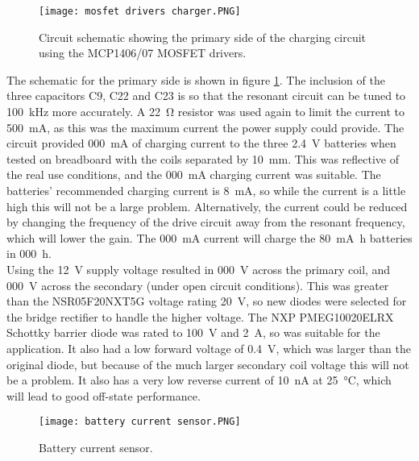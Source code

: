 \begin{figure}[htbp]
	\centering
	\texttt{[image: mosfet drivers charger.PNG]}
	\caption{Circuit schematic showing the primary side of the charging circuit using the MCP1406/07 MOSFET drivers.}
	\label{fig: mosfet drivers charger}
\end{figure}

 
The schematic for the primary side is shown in figure \ref{fig: mosfet drivers charger}. The inclusion of the three capacitors C9, C22 and C23 is so that the resonant circuit can be tuned to \SI{100}{\kilo\hertz} more accurately. A \SI{22}{\ohm} resistor was used again to limit the current to \SI{500}{\milli\ampere}, as this was the maximum current the power supply could provide. The circuit provided \SI{000}{\milli\ampere} of charging current to the three \SI{2.4}{\volt} batteries when tested on breadboard with the coils separated by \SI{10}{\milli\metre}. This was reflective of the real use conditions, and the \SI{000}{\milli\ampere} charging current was suitable. The batteries' recommended charging current is \SI{8}{\milli\ampere}, so while the current is a little high this will not be a large problem. Alternatively, the current could be reduced by changing the frequency of the drive circuit away from the resonant frequency, which will lower the gain. The \SI{000}{\milli\ampere} current will charge the \SI{80}{\milli\ampere\hour} batteries in \SI{000}{\hour}.\\

Using the \SI{12}{\volt} supply voltage resulted in \SI{000}{\volt} across the primary coil, and \SI{000}{\volt} across the secondary (under open circuit conditions). This was greater than the NSR05F20NXT5G voltage rating \SI{20}{\volt}, so new diodes were selected for the bridge rectifier to handle the higher voltage. The NXP PMEG10020ELRX Schottky barrier diode \cite{new_diode} was rated to \SI{100}{\volt} and \SI{2}{\ampere}, so was suitable for the application. It also had a low forward voltage of \SI{0.4}{\volt}, which was larger than the original diode, but because of the much larger secondary coil voltage this will not be a problem. It also has a very low reverse current of \SI{10}{\nano\ampere} at \SI{25}{\celsius}, which will lead to good off-state performance.\\




\begin{figure}[htbp]
	\centering
	\texttt{[image: battery current sensor.PNG]}
	\caption{Battery current sensor.}
	\label{fig: battery current sensor}
\end{figure}

